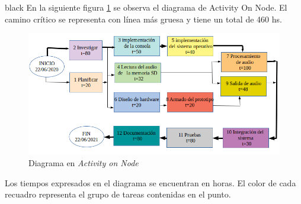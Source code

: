 \documentclass[11pt]{charter}
\begin{document}
\begin{consigna}{black}
En la siguiente figura \ref{fig:AoN} se observa el diagrama de Activity On Node. El camino crítico se representa con línea más gruesa y tiene un total de 460 hs.

\begin{figure}[htpb]
\centering 
\includegraphics[width=.9\textwidth]{./Figuras/AoN.png}
\caption{Diagrama en \textit{Activity on Node}}
\label{fig:AoN}
\end{figure}


Los tiempos expresados en el diagrama se encuentran en horas. El color de cada recuadro
representa el grupo de tareas contenidas en el punto.

\end{consigna}
\end{document}
